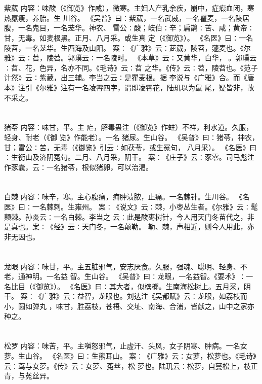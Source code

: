 \documentclass[12pt,UTF8]{ctexbook}
\begin{document}
\section{}紫葳
内容：味酸（《御览》作咸），微寒。主妇人产乳余疾，崩中，症瘕血闭，寒热羸瘦，养胎。生 
川谷。 
《吴普》曰∶紫葳，一名武威，一名瞿麦，一名陵居腹，一名鬼目，一名茏华。神农、 
雷公∶酸；岐伯∶辛；扁鹊∶苦、咸；黄帝∶甘，无毒。如麦根黑。正月、八月采。或生真 
定（《御览》）。 
《名医》曰∶一名陵苕，一名茏华。生西海及山阳。 
案∶《广雅》云∶茈葳，陵苕，蘧麦也。《尔雅》云∶苕，陵苕。郭璞云∶一名陵时。 
《本草》云∶又黄华，白华， 。郭璞云∶苕、花，色异，名亦不同。《毛诗》云∶苕 
之华。《传》云∶苕，陵苕也。《范子计然》云∶紫葳，出三辅。李当之云∶是瞿麦根。据 
李说与《广雅》合。而《唐本》注引《尔雅》注有一名凌霄四字，谓即凌霄花，陆玑以为鼠 
尾，疑皆非，故不采之。 


\section{}猪苓
内容：味甘，平。主 疟，解毒蛊注（《御览》作蛀）不祥，利水道。久服，轻身、耐老（《御 
览》作能老）。一名 猪尿。生山谷。 
《吴普》曰∶猪苓，神农，甘；雷公∶苦，无毒（《御览》引云∶如茯苓，或生冤句， 
八月采）。 
《名医》曰∶生衡山及济阴冤句。二月、八月采，阴干。 
案∶《庄子》云∶豕零。司马彪注作豕囊，云∶一名猪苓，根似猪卵，可以治渴。 


\section{}白棘
内容：味辛，寒。主心腹痛，痈肿渍脓，止痛。一名棘针。生川谷。 
《名医》曰∶一名棘刺。生雍州。 
案∶《说文》云∶棘，小枣丛生者。《尔雅》云∶髦颠棘。孙炎云∶一名白棘。李当之 
云∶此是酸枣树针，今人用天门冬苗代之，非是真也。案∶《经》云∶天门冬，一名颠勒。 
勒、棘，声相近，则今人用此，亦非无因也。 


\section{}龙眼
内容：味甘，平。主五脏邪气，安志厌食。久服，强魂、聪明、轻身、不老，通神明。一名益 
智。生山谷。 
《吴普》曰∶龙眼，一名益智。《要术》∶一名比目（《御览》）。 
《名医》曰∶其大者，似槟榔。生南海松树上。五月采，阴干。 
案∶《广雅》云∶益智，龙眼也。刘达注《吴都赋》云∶龙眼，如荔枝而小，圆如弹丸 
，味甘，胜荔枝，苍梧、交址、南海、合浦，皆献之，山中之家亦种之。 


\section{}松罗
内容：味苦，平。主嗔怒邪气，止虚汗、头风，女子阴寒、肿病。一名女萝。生山谷。 
《名医》曰∶生熊耳山。 
案∶《广雅》云∶女萝，松萝也。《毛诗》云∶茑与女萝。《传》云∶女萝、菟丝，松 
萝也。陆玑云∶松萝，自蔓松上，枝正青，与菟丝异。 
\end{document}
